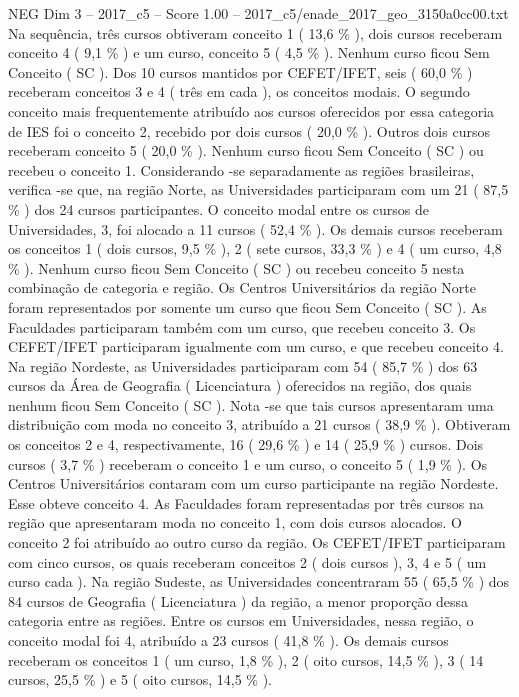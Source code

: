 \begin{textsample}{NEG Dim 3 – 2017\_c5 – Score 1.00 – 2017\_c5/enade\_2017\_geo\_3150a0cc00.txt}
Na sequência, três cursos obtiveram conceito 1 ( 13,6 \% ), dois cursos receberam conceito 4 ( 9,1 \% ) e um curso, conceito 5 ( 4,5 \% ).
Nenhum curso ficou Sem Conceito ( SC ).
Dos 10 cursos mantidos por CEFET/IFET, seis ( 60,0 \% ) receberam conceitos 3 e 4 ( três em cada ), os conceitos modais.
O segundo conceito mais frequentemente atribuído aos cursos oferecidos por essa categoria de IES foi o conceito 2, recebido por dois cursos ( 20,0 \% ).
Outros dois cursos receberam conceito 5 ( 20,0 \% ).
Nenhum curso ficou Sem Conceito ( SC ) ou recebeu o conceito 1.
Considerando -se separadamente as regiões brasileiras, verifica -se que, na região Norte, as Universidades participaram com um 21 ( 87,5 \% ) dos 24 cursos participantes.
O conceito modal entre os cursos de Universidades, 3, foi alocado a 11 cursos ( 52,4 \% ).
Os demais cursos receberam os conceitos 1 ( dois cursos, 9,5 \% ), 2 ( sete cursos, 33,3 \% ) e 4 ( um curso, 4,8 \% ).
Nenhum curso ficou Sem Conceito ( SC ) ou recebeu conceito 5 nesta combinação de categoria e região.
Os Centros Universitários da região Norte foram representados por somente um curso que ficou Sem Conceito ( SC ).
As Faculdades participaram também com um curso, que recebeu conceito 3.
Os CEFET/IFET participaram igualmente com um curso, e que recebeu conceito 4.
Na região Nordeste, as Universidades participaram com 54 ( 85,7 \% ) dos 63 cursos da Área de Geografia ( Licenciatura ) oferecidos na região, dos quais nenhum ficou Sem Conceito ( SC ).
Nota -se que tais cursos apresentaram uma distribuição com moda no conceito 3, atribuído a 21 cursos ( 38,9 \% ).
Obtiveram os conceitos 2 e 4, respectivamente, 16 ( 29,6 \% ) e 14 ( 25,9 \% ) cursos.
Dois cursos ( 3,7 \% ) receberam o conceito 1 e um curso, o conceito 5 ( 1,9 \% ).
Os Centros Universitários contaram com um curso participante na região Nordeste.
Esse obteve conceito 4.
As Faculdades foram representadas por três cursos na região que apresentaram moda no conceito 1, com dois cursos alocados.
O conceito 2 foi atribuído ao outro curso da região.
Os CEFET/IFET participaram com cinco cursos, os quais receberam conceitos 2 ( dois cursos ), 3, 4 e 5 ( um curso cada ).
Na região Sudeste, as Universidades concentraram 55 ( 65,5 \% ) dos 84 cursos de Geografia ( Licenciatura ) da região, a menor proporção dessa categoria entre as regiões.
Entre os cursos em Universidades, nessa região, o conceito modal foi 4, atribuído a 23 cursos ( 41,8 \% ).
Os demais cursos receberam os conceitos 1 ( um curso, 1,8 \% ), 2 ( oito cursos, 14,5 \% ), 3 ( 14 cursos, 25,5 \% ) e 5 ( oito cursos, 14,5 \% ).

\end{textsample}
